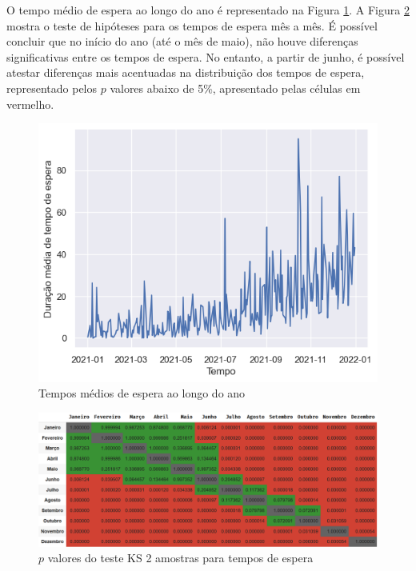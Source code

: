 O tempo médio de espera ao longo do ano é representado na Figura \ref*{fig: espera-tempo}. A Figura \ref*{fig: KS_wait} mostra o teste de hipóteses para os tempos de espera mês a mês. É possível concluir que no início do ano (até o mês de maio), não houve diferenças significativas entre os tempos de espera. No entanto, a partir de junho, é possível atestar diferenças mais acentuadas na distribuição dos tempos de espera, representado pelos $p$ valores abaixo de 5\%, apresentado pelas células em vermelho.

\begin{figure}[H]
    \includegraphics{analise-de-dados/anual/service.png}
    \caption{Tempos médios de espera ao longo do ano}
    \label{fig: espera-tempo}
\end{figure}

\begin{figure}[H]
    \includegraphics[scale=0.55]{analise-de-dados/anual/ks-wait.png}
    \caption{$p$ valores do teste KS 2 amostras para tempos de espera}
    \label{fig: KS_wait}
\end{figure}

